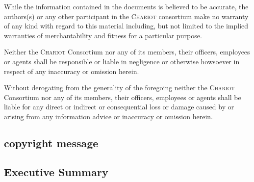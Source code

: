 \documentclass[11pt,a4paper,svgnames]{article}
\begin{document}
\begin{titlepage}
\begin{center}
{{      While the information contained in
      the documents is believed to be accurate, the authors(s) or any
      other participant in the \textsc{Chariot} consortium make no
      warranty of any kind with regard to this material including, but
      not limited to the implied warranties of merchantability and
      fitness for a particular purpose.

      Neither the \textsc{Chariot}
      Consortium nor any of its members, their officers, employees or
      agents shall be responsible or liable in negligence or otherwise
      howsoever in respect of any inaccuracy or omission herein.
      
      Without derogating from the generality of the foregoing neither
      the \textsc{Chariot} Consortium nor any of its members, their
      officers, employees or agents shall be liable for any direct or
      indirect or consequential loss or damage caused by or arising
      from any information advice or inaccuracy or omission herein.  }
  }
\end{center}

\smallskip



 \subsection*{copyright message}

 \begin{center}
 \end{center}

 \smallskip
 

  \subsection*{Executive Summary}


\end{titlepage}
\end{document}
